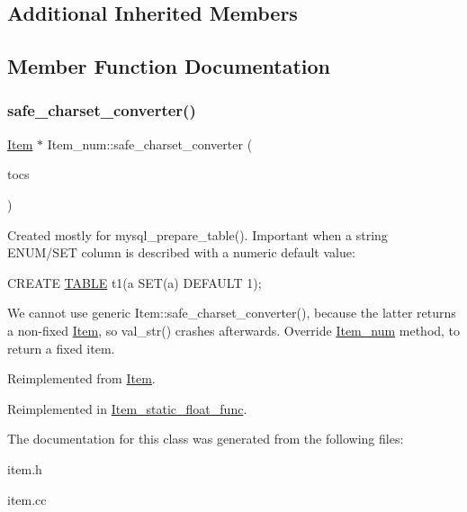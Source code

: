 \subsection*{Additional Inherited Members}


\subsection{Member Function Documentation}
\mbox{\label{classItem__num_a2185b5b16fe2ec007c127b1c3567b233}} 
\subsubsection{\texorpdfstring{safe\+\_\+charset\+\_\+converter()}{safe\_charset\_converter()}}
{\footnotesize\ttfamily \mbox{\hyperlink{classItem}{Item}} $\ast$ Item\+\_\+num\+::safe\+\_\+charset\+\_\+converter (\begin{DoxyParamCaption}\item[{const C\+H\+A\+R\+S\+E\+T\+\_\+\+I\+N\+FO $\ast$}]{tocs }\end{DoxyParamCaption})\hspace{0.3cm}{\ttfamily [virtual]}}

Created mostly for mysql\+\_\+prepare\+\_\+table(). Important when a string E\+N\+U\+M/\+S\+ET column is described with a numeric default value\+:

C\+R\+E\+A\+TE \mbox{\hyperlink{structTABLE}{T\+A\+B\+LE}} t1(a S\+ET(\textquotesingle{}a\textquotesingle{}) D\+E\+F\+A\+U\+LT 1);

We cannot use generic Item\+::safe\+\_\+charset\+\_\+converter(), because the latter returns a non-\/fixed \mbox{\hyperlink{classItem}{Item}}, so val\+\_\+str() crashes afterwards. Override \mbox{\hyperlink{classItem__num}{Item\+\_\+num}} method, to return a fixed item. 

Reimplemented from \mbox{\hyperlink{classItem}{Item}}.



Reimplemented in \mbox{\hyperlink{classItem__static__float__func_a9a61341166a21bae1b91976041ccbd52}{Item\+\_\+static\+\_\+float\+\_\+func}}.



The documentation for this class was generated from the following files\+:\begin{DoxyCompactItemize}
\item 
item.\+h\item 
item.\+cc\end{DoxyCompactItemize}

